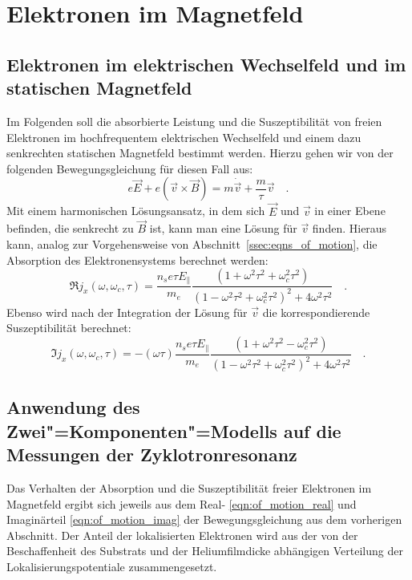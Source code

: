 \section{Elektronen im Magnetfeld}
\label{sec:magnetfeld}

\subsection{Elektronen im elektrischen Wechselfeld und im statischen Magnetfeld}
\label{ssec:eqns_of_motion_B}
Im Folgenden soll die absorbierte Leistung und die Suszeptibilität von freien Elektronen im hochfrequentem elektrischen Wechselfeld und einem dazu senkrechten statischen Magnetfeld bestimmt werden. Hierzu gehen wir von der folgenden Bewegungsgleichung für diesen Fall aus:
\begin{equation}
	e\vec E+e(\vec v\times\vec B)=m\dot{\vec v}+\frac{m}\tau\vec v\quad.
\end{equation}
Mit einem harmonischen Lösungsansatz, in dem sich $\vec E$ und $\vec v$ in einer Ebene befinden, die senkrecht zu $\vec B$ ist, kann man eine Lösung für $\vec v$ finden. Hieraus kann, analog zur Vorgehensweise von Abschnitt~\ref{ssec:eqns_of_motion}, die Absorption des Elektronensystems berechnet werden:
\begin{equation}
	\label{eqn:of_motion_real}
	\Re j_x(\omega, \omega_c, \tau)= \frac{n_s e \tau
		E_{\parallel}}{m_e} \frac{(1+\omega^2\tau^2+\omega_c^2\tau^2)}
		{(1-\omega^2\tau^2+\omega_c^2\tau^2)^2+4 \omega^2\tau^2}\quad.
\end{equation}
Ebenso wird nach der Integration der Lösung für $\vec v$ die korrespondierende Suszeptibilität berechnet:
\begin{equation}
	\label{eqn:of_motion_imag}
	\Im j_x(\omega, \omega_c, \tau)=-(\omega \tau) \frac{n_s e \tau
		E_{\parallel}}{m_e} \frac{(1+\omega^2\tau^2-\omega_c^2\tau^2)}
		{(1-\omega^2\tau^2+\omega_c^2\tau^2)^2+4 \omega^2\tau^2}\quad.
\end{equation}

\subsection{Anwendung des Zwei"=Komponenten"=Modells auf die Messungen der Zyklotronresonanz}
\label{ssec:2KM_anwendung}

Das Verhalten der Absorption und die Suszeptibilität freier Elektronen im Magnetfeld ergibt sich jeweils aus dem Real- \eqref{eqn:of_motion_real} und Imaginärteil \eqref{eqn:of_motion_imag} der Bewegungsgleichung aus dem vorherigen Abschnitt. Der Anteil der lokalisierten Elektronen wird aus der von der Beschaffenheit des Substrats und der Heliumfilmdicke abhängigen Verteilung der Lokalisierungspotentiale zusammengesetzt.

